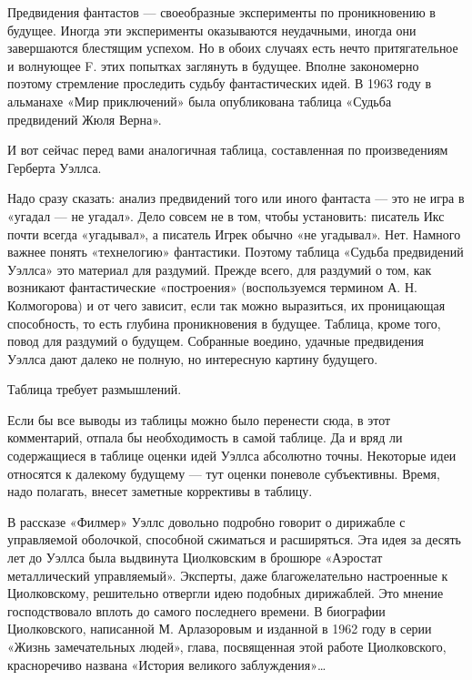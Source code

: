 Предвидения фантастов  —  своеобразные  эксперименты  по  проникновению  в
будущее.  Иногда  эти  эксперименты  оказываются  неудачными,  иногда  они
завершаются  блестящим   успехом.   Но   в  обоих   случаях   есть   нечто
притягательное и волнующее  F. этих попытках  заглянуть в будущее.  Вполне
закономерно поэтому стремление  проследить судьбу  фантастических идей.  В
1963 году в альманахе «Мир приключений» была опубликована таблица  «Судьба
предвидений Жюля Верна».

И вот сейчас перед вами аналогичная таблица, составленная по произведениям
Герберта Уэллса.

Надо сразу сказать: анализ  предвидений того или иного  фантаста — это  не
игра в  «угадал —  не угадал».  Дело совсем  не в  том, чтобы  установить:
писатель  Икс  почти  всегда  «угадывал»,  а  писатель  Игрек  обычно  «не
угадывал». Нет.  Намного важнее  понять «технелогию»  фантастики.  Поэтому
таблица «Судьба  предвидений Уэллса»  это  материал для  раздумий.  Прежде
всего, для  раздумий  о  том, как  возникают  фантастические  «построения»
(воспользуемся термином А.  Н. Колмогорова)  и от чего  зависит, если  так
можно  выразиться,   их   проницающая   способность,   то   есть   глубина
проникновения в  будущее.  Таблица,  кроме  того,  повод  для  раздумий  о
будущем. Собранные  воедино, удачные  предвидения  Уэллса дают  далеко  не
полную, но интересную картину будущего.

Таблица требует размышлений.

Если  бы  все  выводы  из  таблицы  можно  было  перенести  сюда,  в  этот
комментарий, отпала  бы  необходимость  в  самой таблице.  Да  и  вряд  ли
содержащиеся в таблице оценки идей Уэллса абсолютно точны. Некоторые  идеи
относятся к далекому  будущему — тут  оценки поневоле субъективны.  Время,
надо полагать, внесет заметные коррективы в таблицу.

В  рассказе  «Филмер»  Уэллс  довольно  подробно  говорит  о  дирижабле  с
управляемой оболочкой,  способной сжиматься  и  расширяться. Эта  идея  за
десять лет  до  Уэллса  была выдвинута  Циолковским  в  брошюре  «Аэростат
металлический управляемый». Эксперты,  даже благожелательно настроенные  к
Циолковскому, решительно  отвергли идею  подобных дирижаблей.  Это  мнение
господствовало  вплоть   до  самого   последнего  времени.   В   биографии
Циолковского, написанной М.  Арлазоровым и  изданной в 1962  году в  серии
«Жизнь замечательных людей», глава, посвященная этой работе  Циолковского,
красноречиво названа «История великого заблуждения»…


